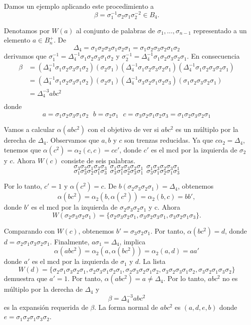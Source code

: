 \documentclass[12pt]{book}
\theoremstyle{definition}
\begin{document}
Damos un ejemplo aplicando este procedimiento a
$$\beta=\sigma_1^{-1}\sigma_2\sigma_1\sigma_2^{-2}\in B_4.$$

Denotamos por $W(a)$ al conjunto de palabras de $\sigma_1,\ldots,\sigma_{n-1}$ representado a un elemento $a\in B_n^+$. De
$$\Delta_4=\sigma_1\sigma_2\sigma_3\sigma_1\sigma_2\sigma_1=\sigma_1\sigma_2\sigma_3\sigma_2\sigma_1\sigma_2$$
derivamos que $\sigma_1^{-1}=\Delta_4^{-1}\sigma_1\sigma_2\sigma_3\sigma_1\sigma_2$ y $\sigma_2^{-1}=\Delta_4^{-1}\sigma_1\sigma_2\sigma_3\sigma_2\sigma_1$. En consecuencia
\begin{align*}
\beta&=(\Delta_4^{-1}\sigma_1\sigma_2\sigma_3\sigma_1\sigma_2)(\sigma_2\sigma_1)(\Delta_4^{-1}\sigma_1\sigma_2\sigma_3\sigma_2\sigma_1)(\Delta_4^{-1}\sigma_1\sigma_2\sigma_3\sigma_2\sigma_1)\\
&=(\Delta_4^{-1}\sigma_1\sigma_2\sigma_3\sigma_1\sigma_2)(\sigma_2\sigma_1)(\Delta_4^{-1}\sigma_3\sigma_2\sigma_1\sigma_2\sigma_3)(\sigma_1\sigma_2\sigma_3\sigma_2\sigma_1)\\
&=\Delta_4^{-3}abc^2\\
\end{align*} 
donde
$$a=\sigma_1\sigma_2\sigma_3\sigma_1\sigma_2\ \ \ b=\sigma_2\sigma_1\ \ \ c=\sigma_3\sigma_2\sigma_1\sigma_2\sigma_3=\sigma_1\sigma_2\sigma_3\sigma_2\sigma_1$$

Vamos a calcular $\alpha(abc^2)$ con el objetivo de ver si $abc^2$ es un múltiplo por la derecha de $\Delta_4$. Observamos que $a,b$ y $c$ son trenzas reducidas. Ya que $c\alpha_2=\Delta_4$, tenemos que $\alpha(c^2)=\alpha_2(c,c)=cc'$, donde $c'$ es el mcd por la izquierda de $\sigma_2$ y $c$. Ahora $W(c)$ consiste de seis palabras.
$$\sigma_3\sigma_2\sigma_1\sigma_2\sigma_3\ \ \sigma_1\sigma_2\sigma_3\sigma_2\sigma_1\ \ \sigma_1\sigma_3\sigma_2\sigma_3\sigma_1$$
$$\sigma_1\sigma_3\sigma_2\sigma_1\sigma_3\ \ \sigma_3\sigma_1\sigma_2\sigma_3\sigma_1\ \ \sigma_3\sigma_1\sigma_2\sigma_1\sigma_3$$

Por lo tanto, $c'=1$ y $\alpha(c^2)=c$. De $b(\sigma_2\sigma_3\sigma_2\sigma_1)=\Delta_4$, obtenemos
$$\alpha(bc^2)=\alpha_2(b,\alpha(c^2))=\alpha_2(b,c)=bb',$$
donde $b'$ es el mcd por la izquierda de $\sigma_2\sigma_3\sigma_2\sigma_1$ y c. Ahora
$$W(\sigma_2\sigma_3\sigma_2\sigma_1)=\{\sigma_2\sigma_3\sigma_2\sigma_1,\sigma_3\sigma_2\sigma_3\sigma_1,\sigma_3\sigma_2\sigma_1\sigma_3\}.$$

Comparando con $W(c)$, obtenemos $b'=\sigma_3\sigma_2\sigma_1$. Por tanto, $\alpha(bc^2)=d$, donde $d=\sigma_2\sigma_1\sigma_3\sigma_2\sigma_1$. Finalmente, $a\sigma_1=\Delta_4$, implica
$$\alpha(abc^2)=\alpha_2(a,\alpha(bc^2))=\alpha_2(a,d)=aa'$$
donde $a'$ es el mcd por la izquierda de $\sigma_1$ y $d$. La lista
$$W(d)=\{\sigma_2\sigma_1\sigma_3\sigma_2\sigma_1,\sigma_2\sigma_3\sigma_1\sigma_2\sigma_1,
\sigma_2\sigma_3\sigma_2\sigma_1\sigma_2,\sigma_3\sigma_2\sigma_3\sigma_1\sigma_2,
\sigma_3\sigma_2\sigma_1\sigma_3\sigma_2\}$$
demuestra que $a'=1$. Por tanto, $\alpha(abc^2)=a\neq\Delta_4$. Por lo tanto, $abc^2$ no es múltiplo por la derecha de $\Delta_4$ y 
$$\beta=\Delta_4^{-3}abc^2$$
es la expansión requerida de $\beta$. La forma normal de $abc^2$ es $(a,d,e,b)$ donde $e=\sigma_1\sigma_2\sigma_1\sigma_3\sigma_2$.
\end{document}
